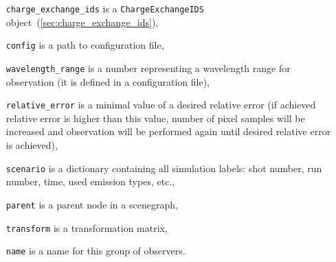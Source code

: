 \documentclass[../main.tex]{subfiles}
\begin{document}
\begin{itemize}[align=left]
    \item[\texttt{charge\_exchange\_ids}] is a \texttt{ChargeExchangeIDS} object~(\cref{sec:charge_exchange_ids}),
    \item[\texttt{config}] is a path to configuration file,
    \item[\texttt{wavelength\_range}] is a number representing a wavelength range for observation (it is defined in a configuration file),
    \item[\texttt{relative\_error}] is a minimal value of a desired relative error (if achieved relative error is higher than this value, number of pixel samples will be increased and observation will be performed again until desired relative error is achieved),
    \item[\texttt{scenario}] is a dictionary containing all simulation labels: shot number, run number, time, used emission types, etc.,
    \item[\texttt{parent}] is a parent node in a scenegraph,
    \item[\texttt{transform}] is a transformation matrix,
    \item[\texttt{name}] is a name for this group of observers.
\end{itemize}
\end{document}
